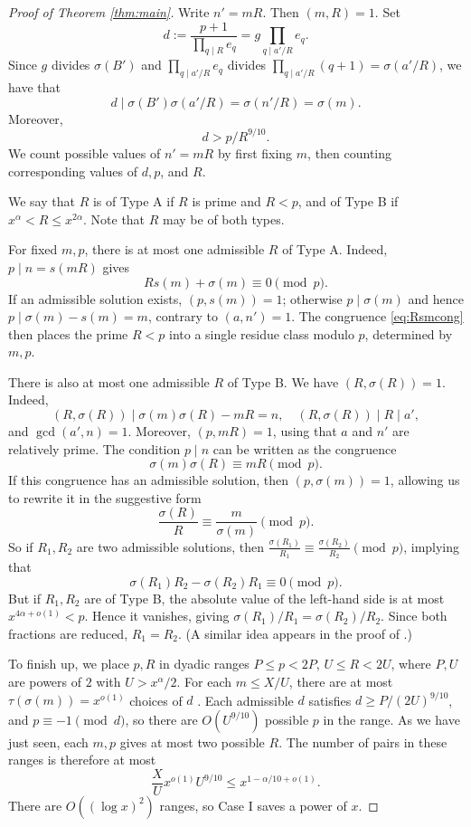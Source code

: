 \documentclass[11pt]{amsart}
\begin{document}
\begin{proof}[Proof of Theorem \ref{thm:main}]
Write $n'=mR$. Then $(m,R)=1$. Set
\[
 d:=\frac{p+1}{\prod_{q\mid R}e_q} = g 
 \prod_{q\mid a'/R} e_q.
\]
Since $g$ divides $\sigma(B')$ and $\prod_{q\mid a'/R} e_q$ divides $\prod_{q\mid a'/R} (q+1) = \sigma(a'/R)$,
we have that
\[ d \mid \sigma(B') \sigma(a'/R) = \sigma(n'/R) = \sigma(m). \]
Moreover,
\[ d > p/R^{9/10}. \]
We count possible values of $n'=mR$ by first fixing $m$, then counting corresponding values of $d,p$, and $R$. 

We say that \(R\) is of Type A if \(R\) is prime and \(R<p\), and of Type B if \(x^\alpha<R\le x^{2\alpha}\). Note that $R$ may be of both types.

For fixed $m,p$, there is at most one admissible $R$ of Type A. Indeed, $p\mid n=s(mR)$ gives \begin{equation}\label{eq:Rsmcong} Rs(m)+\sigma(m)\equiv0\pmod p.\end{equation} If an admissible solution exists, $(p,s(m))=1$; otherwise $p\mid\sigma(m)$ and hence $p\mid \sigma(m)-s(m)=m$, contrary to $(a,n')=1$. The congruence \eqref{eq:Rsmcong} then places the prime $R<p$ into a single residue class modulo $p$, determined by $m,p$.

There is also at most one admissible $R$ of Type B. We have $(R,\sigma(R))=1$. Indeed, 
\[ (R,\sigma(R)) \mid \sigma(m)\sigma(R)-mR = n, \quad (R,\sigma(R))\mid R \mid a', \]
and $\gcd(a',n)=1$. Moreover, $(p,mR)=1$, using that $a$ and $n'$ are relatively prime. The condition $p\mid n$ can be written as the congruence
\[
 \sigma(m)\sigma(R)\equiv mR\pmod p.
\]
If this congruence has an admissible solution, then $(p,\sigma(m))=1$, allowing us to rewrite it in the suggestive form
\[ \frac{\sigma(R)}{R} \equiv \frac{m}{\sigma(m)}\pmod{p}.\]
So if $R_1,R_2$ are two admissible solutions, then $\frac{\sigma(R_1)}{R_1} \equiv \frac{\sigma(R_2)}{R_2} \pmod{p}$, implying that 
\[
 \sigma(R_1)R_2-\sigma(R_2)R_1\equiv0\pmod p.
\]
But if $R_1, R_2$ are of Type B, the absolute value of the left-hand side is at most $x^{4\alpha+o(1)}<p$. Hence it vanishes, giving $\sigma(R_1)/R_1=\sigma(R_2)/R_2$. Since both fractions are reduced, $R_1=R_2$. (A similar idea appears in the proof of \cite[Theorem 3.3]{PollackSinghaRoy2022}.)

To finish up, we place $p,R$ in dyadic ranges $P\le p<2P$, $U\le R<2U$, where $P,U$ are powers of $2$ with $U > x^{\alpha}/2$. For each $m\le X/U$, there are at most $\tau(\sigma(m))=x^{o(1)}$ choices of $d$ \cite[Theorem 315, p.~343]{HardyWright2008}. Each admissible $d$ satisfies $d\ge P/(2U)^{9/10}$, and $p\equiv-1\pmod d$, so there are $O(U^{9/10})$ possible $p$ in the range. As we have just seen, each $m,p$ gives at most two possible $R$. The number of pairs in these ranges is therefore at most
\[
 \frac XU x^{o(1)}U^{9/10}
 \le x^{1-\alpha/10+o(1)}.
\]
There are $O((\log x)^2)$ ranges, so Case I saves a power of $x$.


\end{proof}
\end{document}
